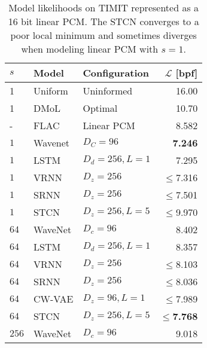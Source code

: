 {\begin{table}[t!]
    \caption[Model likelihoods on TIMIT represented as a 16 bit linear PCM]{
    Model likelihoods on TIMIT represented as a 16 bit linear PCM. The STCN converges to a poor local minimum and sometimes diverges when modeling linear PCM with $s=1$.
    }
    \centering
    \begin{tabular}{ll|lr}
        \toprule
        $s$    & \bfseries Model           & \bfseries Configuration           & \bfseries $\mathcal{L}$ [bpf] \\
        \midrule
        1         & Uniform             & Uninformed            & 16.00 \\
        1         & DMoL                & Optimal               & 10.70 \\   %
        -         & FLAC                & Linear PCM            & 8.582 \\
        \midrule
        $1$       & Wavenet             & $D_C=96$              & \textbf{7.246} \\
        $1$       & LSTM                & $D_d=256, L=1$        & 7.295 \\
        $1$       & VRNN                & $D_z=256$             & $\leq$7.316 \\
        $1$       & SRNN                & $D_z=256$             & $\leq$7.501 \\
        $1$       & STCN                & $D_z=256,L=5$         & $\leq$9.970 \\
        \midrule
        $64$      & WaveNet             & $D_c=96$              & 8.402 \\
        $64$      & LSTM                & $D_d=256, L=1$        & 8.357 \\
        $64$      & VRNN                & $D_z=256$             & $\leq$8.103 \\
        $64$      & SRNN                & $D_z=256$             & $\leq$8.036 \\
        $64$      & CW-VAE              & $D_z=96, L=1$         & $\leq$7.989 \\
        $64$      & STCN                & $D_z=256,L=5$  & $\leq$\textbf{7.768} \\
        \midrule
        $256$      & WaveNet             & $D_c=96$              & 9.018 \\

\end{tabular}
\end{table}}
